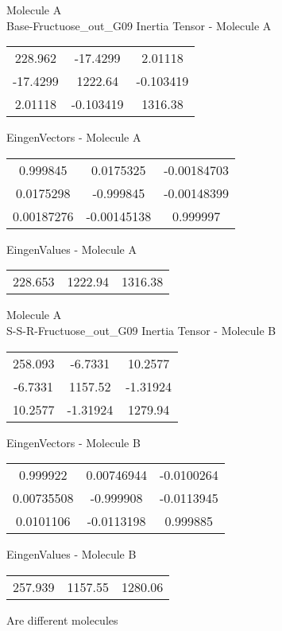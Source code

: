 \newpage
\begin{multicols}{2}
\begin{center}
Molecule A \\ 
Base-Fructuose_out_G09
Inertia Tensor - Molecule A \\
\vtab
\begin{tabular}{|c c c|}
228.962	 & 	-17.4299	 & 	2.01118	 \\
-17.4299	 & 	1222.64	 & 	-0.103419	 \\
2.01118	 & 	-0.103419	 & 	1316.38
\end{tabular}

\vtab
 EingenVectors - Molecule A     \\
\vtab
\begin{tabular}{|c c c|}
0.999845	 & 	0.0175325	 & 	-0.00184703	 \\
0.0175298	 & 	-0.999845	 & 	-0.00148399	 \\
0.00187276	 & 	-0.00145138	 & 	0.999997
\end{tabular}

\vtab
 EingenValues - Molecule A     \\
\vtab
\begin{tabular}{|c c c|}
228.653	 & 	1222.94	 & 	1316.38
\end{tabular}
\columnbreak
Molecule A \\ 
S-S-R-Fructuose_out_G09
Inertia Tensor - Molecule B \\
\vtab
\begin{tabular}{|c c c|}
258.093	 & 	-6.7331	 & 	10.2577	 \\
-6.7331	 & 	1157.52	 & 	-1.31924	 \\
10.2577	 & 	-1.31924	 & 	1279.94
\end{tabular}

\vtab
 EingenVectors - Molecule B     \\
\vtab
\begin{tabular}{|c c c|}
0.999922	 & 	0.00746944	 & 	-0.0100264	 \\
0.00735508	 & 	-0.999908	 & 	-0.0113945	 \\
0.0101106	 & 	-0.0113198	 & 	0.999885
\end{tabular}

\vtab
 EingenValues - Molecule B     \\
\vtab
\begin{tabular}{|c c c|}
257.939	 & 	1157.55	 & 	1280.06
\end{tabular}
\textcolor{NavyBlue}{\large Are different molecules}
\end{center}
\end{multicols}
